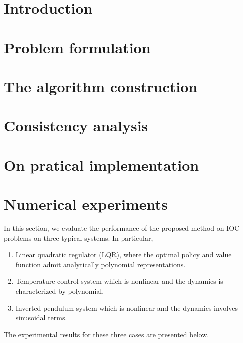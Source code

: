 \documentclass[twocolumn]{autart}
\numberwithin{theorem}{section}
\begin{document}
\section{Introduction}\label{sec:introduction}


\section{Problem formulation}\label{sec:problem_formulation}



\section{The algorithm construction}\label{sec:alg_construct}


\section{Consistency analysis}\label{sec:consistency}


\section{On pratical implementation }\label{sec:practical_implementation}


\section{Numerical experiments}\label{sec:numerical-expe}
In this section, we evaluate the performance of the proposed method on IOC problems on three typical systems. In particular,
\begin{enumerate}
    \item Linear quadratic regulator (LQR), where the optimal policy and value function admit analytically polynomial representations. 
    \item Temperature control system which is nonlinear and the dynamics is characterized by polynomial. 
    \item Inverted pendulum system which is nonlinear and the dynamics involves sinusoidal terms. 
\end{enumerate}
The experimental results for these three cases are presented  below.
\end{document}
